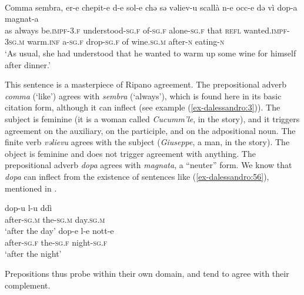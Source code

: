 \documentclass[output=paper
,modfonts
,nonflat]{langsci/langscibook}
\begin{document}
\begin{exe}
\ex \citet[78]{Lambertelli2003}\\
	\gll Comma   sembra,   er-e     chepit-e     d-e   sol-e     chǝ sǝ   vǝliev-u     scallà     n-e   occ-e     dǝ   vì dop-a   magnat-a\\
	as always   be.\textsc{impf-3.f} understood-\textsc{sg.f} of-\textsc{sg.f}   alone-\textsc{sg.f} that \textsc{refl} wanted.\textsc{impf-3sg.m} warm.\textsc{inf} a-\textsc{sg.f} drop-\textsc{sg.f} of   wine.\textsc{sg.m} after-\textsc{n}   eating-\textsc{n}\\
	\glt `As usual, she had understood that he wanted to warm up some wine for himself after dinner.'
\end{exe}
This sentence is a masterpiece of Ripano agreement. The prepositional adverb \textit{comma} (‘like’) agrees with \textit{sembra} (‘always’), which is found here in its basic citation form, although it can inflect (see example (\ref{ex-dalessandro:3})). The subject is feminine (it is a woman called \textit{Cucumm’le}, in the story), and it triggers agreement on the auxiliary, on the participle, and on the adpositional noun. The finite verb \textit{vǝlievu} agrees with the subject (\textit{Giuseppe}, a man, in the story). The object is feminine and does not trigger agreement with anything. The prepositional adverb \textit{dopa} agrees with \textit{magnata}, a “neuter” form. We know that \textit{dopa} can inflect from the existence of sentences like (\ref{ex-dalessandro:56}), mentioned in \citet{Ledgeway2012}.

\begin{exe}
	\ex\label{ex-dalessandro:56} \citet[309]{Ledgeway2012} \xlist
	\ex 
	\gll dop-u     l-u     ddì\\
	after-\textsc{sg.m} the-\textsc{sg.m} day.\textsc{sg.m}\\
	\glt `after the day' 
	\ex
	\gll   dop-e     l-e     nott-e\\
	after-\textsc{sg.f} the-\textsc{sg.f} night-\textsc{sg.f}\\
	\glt `after the night' 
	\endxlist
\end{exe}
Prepositions thus probe within their own domain, and tend to agree with their complement.
\end{document}
